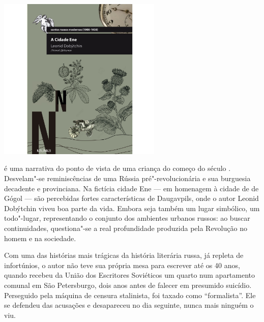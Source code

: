 \begin{center}
\hspace*{.5cm}\includegraphics[width=78mm]{./grid/cidaden.jpg}
\end{center}

\hspace*{-7cm}\hrulefill\hspace*{-7cm}

\medskip

 é uma narrativa do ponto de vista de uma criança do começo do século . Desvelam"-se reminiscências de uma Rússia pré"-revolucionária e sua burguesia decadente e provinciana. Na fictícia cidade Ene --- em homenagem à cidade de {} de Gógol --- são percebidas fortes características de Daugavpils, onde o autor Leonid Dobýtchin viveu boa parte da vida. Embora seja também um lugar simbólico, um todo"-lugar, representando o conjunto dos ambientes urbanos russos: ao buscar continuidades, questiona"-se a real profundidade produzida pela Revolução  no homem e na sociedade.

Com uma das histórias mais trágicas da história literária russa, já repleta de infortúnios, o autor não teve sua própria mesa para escrever até os 40 anos, quando recebeu da União dos Escritores Soviéticos um quarto num apartamento comunal em São Petersburgo, dois anos antes de falecer em presumido suicídio. Perseguido pela máquina de censura stalinista, foi taxado como “formalista”. Ele se defendeu das acusações e desapareceu no dia seguinte, nunca mais ninguém o viu.

\vfill

\hspace*{-.4cm}\begin{minipage}[c]{.5\linewidth}
\small{
{}}
\end{minipage}


